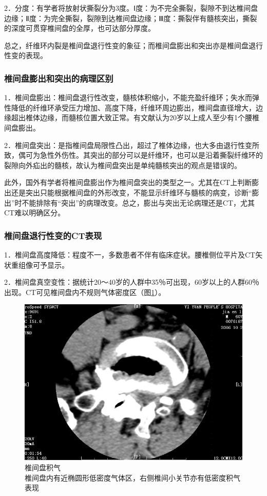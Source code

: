 2．分度：有学者将放射状撕裂分为3度。Ⅰ度：为不完全撕裂，裂隙不到达椎间盘边缘；Ⅱ度：为完全撕裂，裂隙到达椎间盘边缘；Ⅲ度：撕裂伴有髓核突出，撕裂的深度可贯穿椎间盘的全厚，也可达部分厚度。

总之，纤维环内裂是椎间盘退行性变的象征；而椎间盘膨出和突出亦是椎间盘退行性变的表现。

\subsubsection{椎间盘膨出和突出的病理区别}

1．椎间盘膨出：椎间盘退行性改变，髓核体积缩小，不能充盈纤维环；失水而弹性降低的纤维环承受压力增加、高度下降，纤维环周边膨出，椎间盘直径增大，边缘超出椎体边缘，而髓核位置大致正常。有文献认为20岁以上成人至少有1个腰椎间盘膨出。

2．椎间盘突出：是指椎间盘局限性凸出，超过了椎体边缘，也大多由退行性变所致，偶可为急性外伤性。其突出的部分可以是纤维环，也可以是沿着撕裂纤维环的裂隙向外疝出的髓核，故认为椎间盘突出是单纯髓核突出的观点是错误的。

此外，国外有学者将椎间盘膨出作为椎间盘突出的类型之一。尤其在CT上判断膨出还是突出只能根据椎间盘的外形改变，不能显示纤维环与髓核的病变，诊断“膨出”时不能排除有“突出”的病理改变。总之，膨出与突出无论病理还是CT，尤其CT难以明确区分。

\subsubsection{椎间盘退行性变的CT表现}

1．椎间盘高度降低：程度不一，多数患者不伴有临床症状。腰椎侧位平片及CT矢状重组像可予显示。

2．椎间盘真空变性：据统计20～40岁的人群中35％可出现，60岁以上的人群60％出现。CT可见椎间盘内不规则气体密度区（图\ref{fig23-4}）。

\begin{figure}[!htbp]
 \centering
 \includegraphics[width=.7\textwidth,height=\textheight,keepaspectratio]{./images/Image00467.jpg}
 \captionsetup{justification=centering}
 \caption{椎间盘积气\\{\small 椎间盘内有近椭圆形低密度气体区，右侧椎间小关节亦有低密度积气表现}}
 \label{fig23-4}
  \end{figure} 

